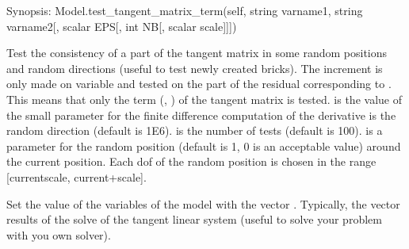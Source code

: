 \documentclass[a4paper,11pt,english]{sphinxmanual}
\begin{document}
\begin{fulllineitems}
\begin{fulllineitems}
\end{fulllineitems}


\begin{fulllineitems}
\label{\detokenize{python/cmdref_Model:getfem.Model.test_tangent_matrix_term}}
Synopsis: Model.test\_tangent\_matrix\_term(self, string varname1, string varname2{[}, scalar EPS{[}, int NB{[}, scalar scale{]}{]}{]})

Test the consistency of a part of the tangent matrix in some
random positions and random directions
(useful to test newly created bricks).
The increment is only made on variable  and tested on the
part of the residual corresponding to . This means that
only the term (, ) of the tangent matrix is tested.
 is the value of the small parameter for the finite difference
computation of the derivative is the random direction (default is 1E\sphinxhyphen{}6).
 is the number of tests (default is 100).  is a parameter
for the random position (default is 1, 0 is an acceptable value)
around the current position.
Each dof of the random position is chosen in the range
{[}current\sphinxhyphen{}scale, current+scale{]}.

\end{fulllineitems}


\begin{fulllineitems}
\label{\detokenize{python/cmdref_Model:getfem.Model.to_variables}}
Set the value of the variables of the model with the vector .
Typically, the vector  results of the solve of the tangent
linear system (useful to solve your problem with you own solver).

\end{fulllineitems}



\end{fulllineitems}
\end{document}
